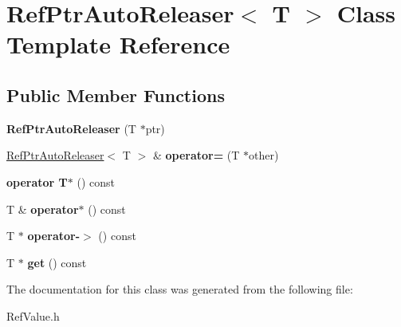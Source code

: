 \hypertarget{class_ref_ptr_auto_releaser}{}\section{Ref\+Ptr\+Auto\+Releaser$<$ T $>$ Class Template Reference}
\label{class_ref_ptr_auto_releaser}
\subsection*{Public Member Functions}
\begin{DoxyCompactItemize}
\item 
\mbox{\label{class_ref_ptr_auto_releaser_a06b1026cc3d537522073844d8526ba78}} 
{\bfseries Ref\+Ptr\+Auto\+Releaser} (T $\ast$ptr)
\item 
\mbox{\label{class_ref_ptr_auto_releaser_a2ec75e12ac6e9d294125848b0c7f35d6}} 
\hyperlink{class_ref_ptr_auto_releaser}{Ref\+Ptr\+Auto\+Releaser}$<$ T $>$ \& {\bfseries operator=} (T $\ast$other)
\item 
\mbox{\label{class_ref_ptr_auto_releaser_a8babf14e364e0559772613a434821d92}} 
{\bfseries operator T$\ast$} () const
\item 
\mbox{\label{class_ref_ptr_auto_releaser_a8472379e9cab3f017c14370e19cd9234}} 
T \& {\bfseries operator$\ast$} () const
\item 
\mbox{\label{class_ref_ptr_auto_releaser_a5974ef236f18d1756abb4728b18dc6f4}} 
T $\ast$ {\bfseries operator-\/$>$} () const
\item 
\mbox{\label{class_ref_ptr_auto_releaser_a656f675c7ccb7ea94c6c8f9da2c579d8}} 
T $\ast$ {\bfseries get} () const
\end{DoxyCompactItemize}


The documentation for this class was generated from the following file\+:\begin{DoxyCompactItemize}
\item 
Ref\+Value.\+h\end{DoxyCompactItemize}
